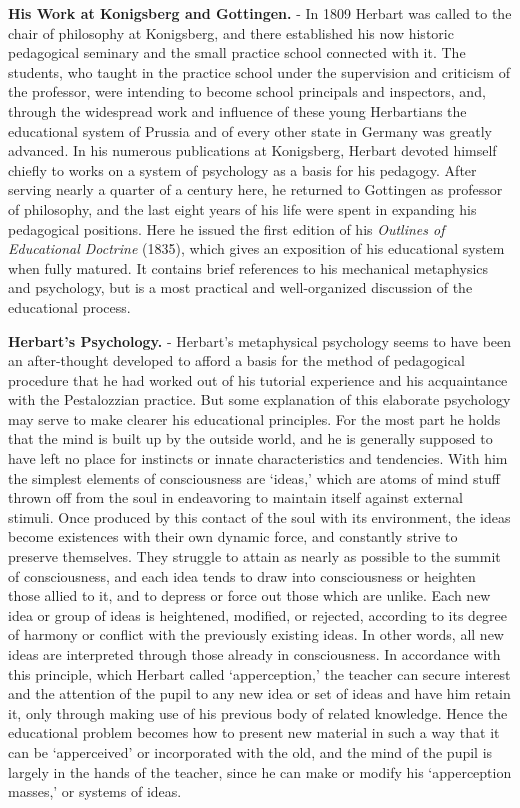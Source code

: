 \documentclass[]{book}
\begin{document}
\textbf{His Work at Konigsberg and Gottingen.} - In 1809 Herbart was called to the chair of philosophy at Konigsberg, and there established his now historic pedagogical seminary and the small practice school connected with it. The students, who taught in the practice school under the supervision and criticism of the professor, were intending to become school principals and inspectors, and, through the widespread work and influence of these young Herbartians the educational system of Prussia and of every other state in Germany was greatly advanced. In his numerous publications at Konigsberg, Herbart devoted himself chiefly to works on a system of psychology as a basis for his pedagogy. After serving nearly a quarter of a century here, he returned to Gottingen as professor of philosophy, and the last eight years of his life were spent in expanding his pedagogical positions. Here he issued the first edition of his \emph{Outlines of Educational Doctrine} (1835), which gives an exposition of his educational system when fully matured. It contains brief references to his mechanical metaphysics and psychology, but is a most practical and well-organized discussion of the educational process.

\textbf{Herbart's Psychology.} - Herbart's metaphysical psychology seems to have been an after-thought developed to afford a basis for the method of pedagogical procedure that he had worked out of his tutorial experience and his acquaintance with the Pestalozzian practice. But some explanation of this elaborate psychology may serve to make clearer his educational principles. For the most part he holds that the mind is built up by the outside world, and he is generally supposed to have left no place for instincts or innate characteristics and tendencies. With him the simplest elements of consciousness are `ideas,' which are atoms of mind stuff thrown off from the soul in endeavoring to maintain itself against external stimuli. Once produced by this contact of the soul with its environment, the ideas become existences with their own dynamic force, and constantly strive to preserve themselves. They struggle to attain as nearly as possible to the summit of consciousness, and each idea tends to draw into consciousness or heighten those allied to it, and to depress or force out those which are unlike. Each new idea or group of ideas is heightened, modified, or rejected, according to its degree of harmony or conflict with the previously existing ideas. In other words, all new ideas are interpreted through those already in consciousness. In accordance with this principle, which Herbart called `apperception,' the teacher can secure interest and the attention of the pupil to any new idea or set of ideas and have him retain it, only through making use of his previous body of related knowledge. Hence the educational problem becomes how to present new material in such a way that it can be `apperceived' or incorporated with the old, and the mind of the pupil is largely in the hands of the teacher, since he can make or modify his `apperception masses,' or systems of ideas.
\end{document}
